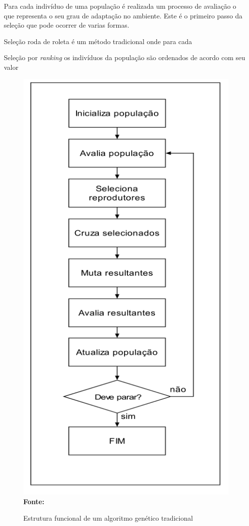\documentclass{abntpuc}
\begin{document}
Para cada indivíduo de uma população é realizada um processo de avaliação o que representa o seu grau de adaptação no ambiente. Este é o primeiro passo da seleção que pode ocorrer de varias formas.\par

Seleção roda de roleta é um método tradicional onde para cada 

Seleção por \textit{ranking} os indivíduos da população são ordenados de acordo com seu valor 






\begin{figure}[!htb]
\caption[Estrutura funcional de um algoritmo genético tradicional]{Estrutura funcional de um algoritmo genético tradicional}
\label{fig:ag}
\centering
\includegraphics[scale=0.62]{imagens/ag.png}
\\ \textbf{\footnotesize Fonte: \cite{lucas2000algoritmos}}
\end{figure}
\end{document}
